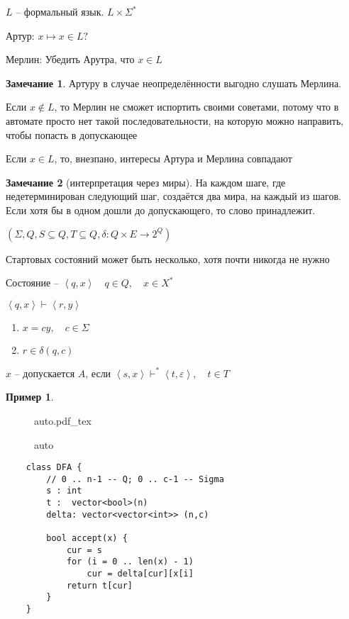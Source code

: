 \documentclass{book}
\theoremstyle{definition}
\newtheorem*{note}{Замечание}
\newtheorem*{example}{Пример}
\newcommand{\incfig}[1]{%
    \def\svgwidth{\columnwidth}
    {#1.pdf_tex}
}
\begin{document}
$L$ -- формальный язык.  $L\times \Sigma^*$

Артур: $x \mapsto x\in L?$

Мерлин: Убедить Арутра, что $x\in L$

\begin{note}
   Артуру в случае неопределённости выгодно слушать Мерлина.

   Если $x\not\in L$, то Мерлин не сможет испортить своими советами, потому что в автомате просто нет такой последовательности, на которую можно направить, чтобы попасть в допускающее

   Если $x\in L$, то, внезпано, интересы Артура и Мерлина совпадают
\end{note}

\begin{note}
    [интерпретация через миры]

    На каждом шаге, где недетерминирован следующий шаг, создаётся два мира, на каждый из шагов. Если хотя бы в одном дошли до допускающего, то слово принадлежит.
\end{note}

\begin{definition}
    [НКА]

    $\left( \Sigma, Q, S\subseteq Q, T\subseteq Q, \delta:Q\times E \to 2^{Q} \right) $ 

    Стартовых состояний может быть несколько, хотя почти никогда не нужно


    Состояние -- $\left<q, x \right>\quad q\in Q,\quad x\in X^*$

    $\left<q,x \right>\vdash \left<r,y \right>$

    \begin{enumerate}
        \item $x = cy,\quad c\in \Sigma$
        \item  $r\in\delta\left( q,c \right) $
    \end{enumerate}

    $x$ -- допускается  $A$, если  $\left<s,x \right>\vdash^* \left<t,\varepsilon \right>,\quad t\in T$
\end{definition}

\begin{example}
\begin{figure}[!ht]
    \centering
    \incfig{auto}
    \caption{auto}
    \label{fig:auto}
\end{figure}
\end{example}

\begin{verbatim}
    class DFA {
        // 0 .. n-1 -- Q; 0 .. c-1 -- Sigma
        s : int
        t :  vector<bool>(n)
        delta: vector<vector<int>> (n,c)

        bool accept(x) {
            cur = s
            for (i = 0 .. len(x) - 1)
                cur = delta[cur][x[i]
            return t[cur]
        }
    }   
\end{verbatim}
\end{document}
